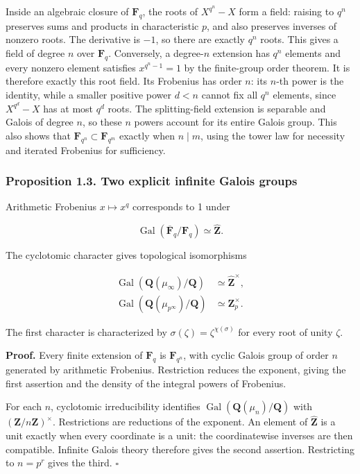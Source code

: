 \documentclass[11pt,a4paper]{article}
\begin{document}
Inside an algebraic closure of \(\mathbf F_q\), the roots of
\(X^{q^n}-X\) form a field: raising to \(q^n\) preserves sums and
products in characteristic \(p\), and also preserves inverses of nonzero
roots. The derivative is \(-1\), so there are exactly \(q^n\) roots.
This gives a field of degree \(n\) over \(\mathbf F_q\). Conversely, a
degree-\(n\) extension has \(q^n\) elements and every nonzero element
satisfies \(x^{q^n-1}=1\) by the finite-group order theorem. It is
therefore exactly this root field. Its Frobenius has order \(n\): its
\(n\)-th power is the identity, while a smaller positive power \(d<n\)
cannot fix all \(q^n\) elements, since \(X^{q^d}-X\) has at most \(q^d\)
roots. The splitting-field extension is separable and Galois of degree
\(n\), so these \(n\) powers account for its entire Galois group. This
also shows that \(\mathbf F_{q^n}\subset\mathbf F_{q^m}\) exactly when
\(n\mid m\), using the tower law for necessity and iterated Frobenius
for sufficiency.

\subsubsection{Proposition 1.3. Two explicit infinite Galois
groups}\label{proposition-1.3.-two-explicit-infinite-galois-groups}

Arithmetic Frobenius \(x\mapsto x^q\) corresponds to 1 under

\[
\operatorname{Gal}(\overline{\mathbf F}_q/\mathbf F_q)\simeq\widehat{\mathbf Z}.
\]

The cyclotomic character gives topological isomorphisms

\[
\begin{aligned}
\operatorname{Gal}(\mathbf Q(\mu_\infty)/\mathbf Q)&\simeq\widehat{\mathbf Z}^{\times},\\
\operatorname{Gal}(\mathbf Q(\mu_{p^\infty})/\mathbf Q)&\simeq\mathbf Z_p^{\times}.
\end{aligned}
\]

The first character is characterized by
\(\sigma(\zeta)=\zeta^{\chi(\sigma)}\) for every root of unity
\(\zeta\).

\textbf{Proof.} Every finite extension of \(\mathbf F_q\) is
\(\mathbf F_{q^n}\), with cyclic Galois group of order \(n\) generated
by arithmetic Frobenius. Restriction reduces the exponent, giving the
first assertion and the density of the integral powers of Frobenius.

For each \(n\), cyclotomic irreducibility identifies
\(\operatorname{Gal}(\mathbf Q(\mu_n)/\mathbf Q)\) with
\((\mathbf Z/n\mathbf Z)^\times\). Restrictions are reductions of the
exponent. An element of \(\widehat{\mathbf Z}\) is a unit exactly when
every coordinate is a unit: the coordinatewise inverses are then
compatible. Infinite Galois theory therefore gives the second assertion.
Restricting to \(n=p^r\) gives the third. \(\square\)
\end{document}

